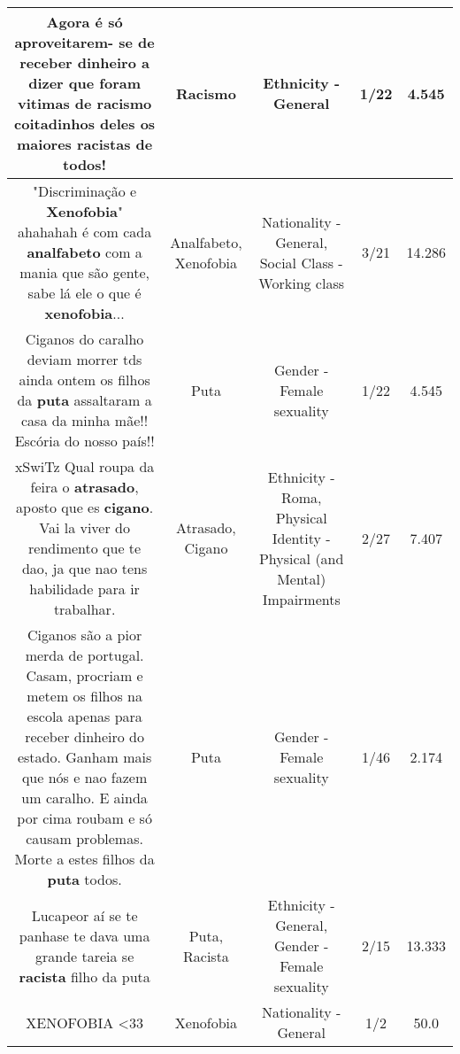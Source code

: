 \documentclass[11pt]{article}
\newlength\mylength
\begin{document}
\begin{center}
\begin{longtable}{|C{.65\mylength}|C{.30\mylength}|C{.12\mylength}|C{.12\mylength}|C{.12\mylength}|}
  \small Agora é só aproveitarem- se de receber dinheiro a dizer que foram vitimas de \textbf{racismo} coitadinhos deles os maiores racistas de todos!\normalsize   & Racismo & Ethnicity - General & 1/22 & 4.545 \\  \hline
  \small "Discriminação e \textbf{Xenofobia}" ahahahah é com cada \textbf{analfabeto} com a mania que são gente, sabe lá ele o que é \textbf{xenofobia}...\normalsize   & Analfabeto, Xenofobia & Nationality - General, Social Class - Working class & 3/21 & 14.286 \\  \hline
  \small Ciganos do caralho deviam morrer tds ainda ontem os filhos da \textbf{puta} assaltaram a casa da minha mãe!! Escória do nosso país!!\normalsize   & Puta & Gender - Female sexuality & 1/22 & 4.545 \\  \hline
  \small xSwiTz Qual roupa da feira o \textbf{atrasado}, aposto que es \textbf{cigano}. Vai la viver do rendimento que te dao, ja que nao tens habilidade para ir trabalhar.\normalsize   & Atrasado, Cigano & Ethnicity - Roma, Physical Identity - Physical (and Mental) Impairments & 2/27 & 7.407 \\  \hline
  \small Ciganos são a pior merda de portugal. Casam, procriam e metem os filhos na escola apenas para receber dinheiro do estado. Ganham mais que nós e nao fazem um caralho. E ainda por cima roubam e só causam problemas. Morte a estes filhos da \textbf{puta} todos.\normalsize   & Puta & Gender - Female sexuality & 1/46 & 2.174 \\  \hline
  \small Lucapeor aí se te panhase te dava uma grande tareia se \textbf{racista} filho da puta\normalsize   & Puta, Racista & Ethnicity - General, Gender - Female sexuality & 2/15 & 13.333 \\  \hline
  \small XENOFOBIA <33\normalsize   & Xenofobia & Nationality - General & 1/2 & 50.0 \\  \hline

\end{longtable}
\end{center}
\end{document}

